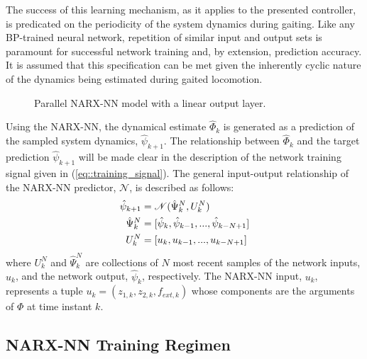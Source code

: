 The success of this learning mechanism, as it applies to the presented controller, is predicated on the periodicity of the system dynamics during gaiting. Like any BP-trained neural network, repetition of similar input and output sets is paramount for successful network training and, by extension, prediction accuracy. It is assumed that this specification can be met given the inherently cyclic nature of the dynamics being estimated during gaited locomotion. 
	\begin{figure}[t!]
		\centering
		\caption{Parallel NARX-NN model with a linear output layer.}
		\label{fig::narx_net}
		\vspace{-5.5mm}
	\end{figure}
Using the NARX-NN, the dynamical estimate $\hat{\Phi}_{k}$ is generated as a prediction of the sampled system dynamics, $\hat{\psi}_{k+1}$. The relationship between $\hat{\Phi}_{k}$ and the target prediction $\hat{\psi}_{k+1}$ will be made clear in the description of the network training signal given in (\ref{eq::training_signal}). The general input-output relationship of the NARX-NN predictor, $\mathscr{N}$, is described as follows:
	\begin{equation}
		\vspace{-1.5mm}
		\begin{split}
		\hat{\psi}_{k+1}	&= \mathscr{N}(\hat{\Psi}_{k}^{N},{U}_{k}^{N}) \\
		\hat{\Psi}_{k}^{N}	&= [\hat{\psi}_{k},\hat{\psi}_{k-1},...,\hat{\psi}_{k-N+1}]  \\
		{U}_{k}^{N}			&= [u_{k}   ,u_{k-1}   ,...,u_{k-N+1}   ]
		\end{split}
		\label{eq::narx_model}
	\end{equation}
where ${U}_{k}^{N}$  and $\hat{\Psi}_{k}^{N}$ are collections of $N$ most recent samples of the network inputs, $u_{k}$, and the network output, $\hat{\psi}_{k}$, respectively. The NARX-NN input, $u_{k}$, represents a tuple $u_{k} = (z_{1,k}, z_{2,k}, f_{ext,k})$ whose components are the arguments of $\Phi$ at time instant $k$. 



\subsection{NARX-NN Training Regimen}
	

